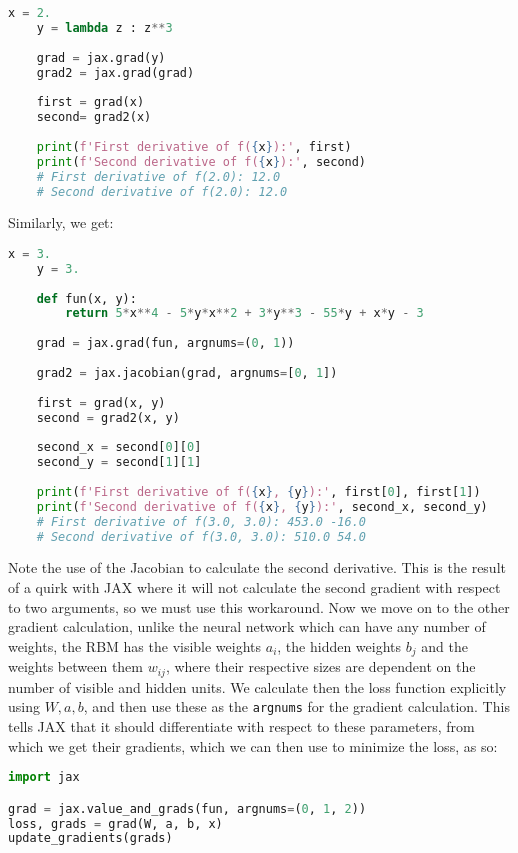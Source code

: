 \documentclass[12pt]{article}
\begin{document}
{\begin{lstlisting}[language=Python]
    x = 2.
    y = lambda z : z**3
    
    grad = jax.grad(y)
    grad2 = jax.grad(grad)
    
    first = grad(x)
    second= grad2(x)
    
    print(f'First derivative of f({x}):', first)
    print(f'Second derivative of f({x}):', second)
    # First derivative of f(2.0): 12.0
    # Second derivative of f(2.0): 12.0
\end{lstlisting}
Similarly, we get:
\begin{lstlisting}[language=Python]
    x = 3.
    y = 3.
    
    def fun(x, y):
        return 5*x**4 - 5*y*x**2 + 3*y**3 - 55*y + x*y - 3
    
    grad = jax.grad(fun, argnums=(0, 1))
    
    grad2 = jax.jacobian(grad, argnums=[0, 1])
    
    first = grad(x, y)
    second = grad2(x, y)
    
    second_x = second[0][0]
    second_y = second[1][1]
    
    print(f'First derivative of f({x}, {y}):', first[0], first[1])
    print(f'Second derivative of f({x}, {y}):', second_x, second_y)
    # First derivative of f(3.0, 3.0): 453.0 -16.0
    # Second derivative of f(3.0, 3.0): 510.0 54.0
\end{lstlisting}
Note the use of the Jacobian to calculate the second derivative. This is the result of a quirk with JAX where it will not calculate the second gradient with respect to two arguments, so we must use this workaround.
\newline
Now we move on to the other gradient calculation, unlike the neural network which can have any number of weights, the RBM has the visible weights $a_i$, the hidden weights $b_j$ and the weights between them $w_{ij}$, where their respective sizes are dependent on the number of visible and hidden units.
\newline
We calculate then the loss function explicitly using $W, a, b$, and then use these as the \texttt{argnums} for the gradient calculation. This tells JAX that it should differentiate with respect to these parameters, from which we get their gradients, which we can then use to minimize the loss, as so:
\begin{lstlisting}[language=Python]
import jax

grad = jax.value_and_grads(fun, argnums=(0, 1, 2))
loss, grads = grad(W, a, b, x)
update_gradients(grads)


\end{lstlisting}}
\end{document}

